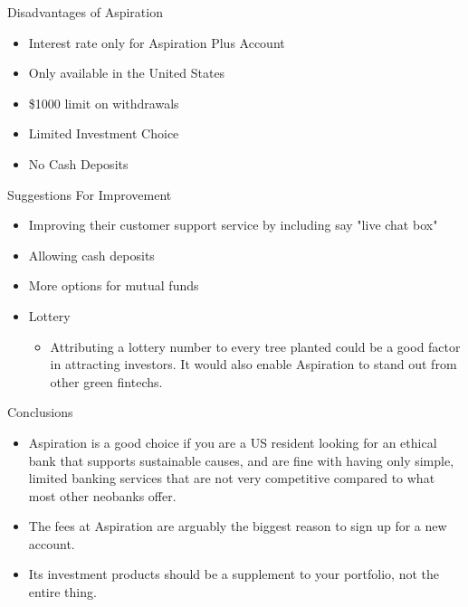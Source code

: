 \documentclass{beamer}
\begin{document}
\begin{frame} {Disadvantages of Aspiration}
\begin{itemize}

\item Interest rate only for Aspiration Plus Account
\item Only available in the United States
\item \$1000 limit on withdrawals
\item Limited Investment Choice
\item No Cash Deposits

              
           
\end{itemize}
    
\end{frame}  
\begin{frame} {Suggestions For Improvement}
    \begin{itemize}
        \item Improving their customer support service by including say "live chat box"
        \item Allowing cash deposits 
        \item More options for mutual funds 
         \item Lottery
        \begin{itemize}
            \item Attributing a lottery number to every tree planted could be a good factor in attracting investors. It would also enable Aspiration to stand out from other green fintechs.
        \end{itemize}     
           
    \end{itemize}
    
    
\end{frame}

\begin{frame} {Conclusions}
\begin{itemize}
\item Aspiration is a good choice if you are a US resident looking for an ethical bank that supports sustainable causes, and are fine with having only simple, limited banking services that are not very competitive compared to what most other neobanks offer.  
\item The fees at Aspiration are arguably the biggest reason to sign up for a new account.
\item  Its investment products should be a supplement to your portfolio, not the entire thing.
\end{itemize}
\end{frame}
\end{document}
